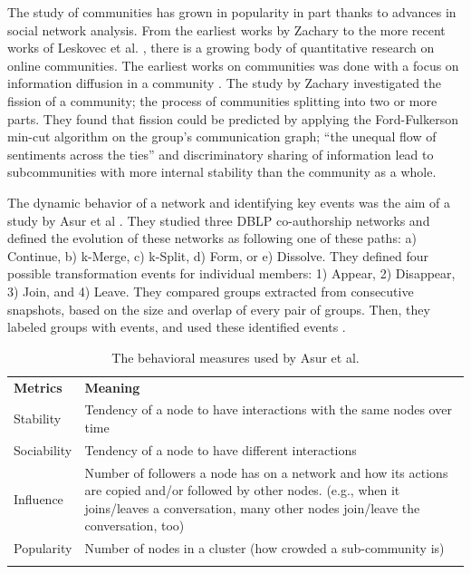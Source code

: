 \documentclass[12pt]{report}
\begin{document}
The study of communities has grown in popularity in part thanks to advances in social network analysis.  From the earliest works by Zachary \cite{Zachary} to the more recent works of Leskovec et al. \cite{LeskovecGraphsOverTime}\cite{LeskovecStatisticalPropertiesOfCommunityStructure}, there is a growing body of quantitative research on online communities. The earliest works on communities was done with a focus on information diffusion in a community \cite{Zachary}. The study by Zachary investigated the fission of a community; the process of communities splitting into two or more parts. They found that fission could be predicted by applying the Ford-Fulkerson min-cut algorithm \cite{Ford} on the group's communication graph; ``the unequal flow of sentiments across the ties'' and discriminatory sharing of information lead to subcommunities with more internal stability than the community as a whole.\cite{Zachary}

The dynamic behavior of a network and identifying key events was the aim of a study by Asur et al \cite{Asur}. They studied three DBLP co-authorship networks and defined the evolution of these networks as following one of these paths: a) Continue, b) k-Merge, c) k-Split, d) Form, or e) Dissolve. They defined four possible transformation events for individual members: 1) Appear, 2) Disappear, 3) Join, and 4) Leave. They compared groups extracted from consecutive snapshots, based on the size and overlap of every pair of groups. Then, they labeled groups with events, and used these identified events \cite{Asur}.

\begin{table}[!htbp]
\caption{The behavioral measures used by Asur et al. \cite{Asur}}
\label{tableDiversityMeasuresAsurEtAl} 
\begin{tabular}{p{} p{}}
\hline\noalign{\smallskip}
\textbf{Metrics} & \textbf{Meaning} \\
\noalign{\smallskip}\hline\noalign{\smallskip}
Stability & Tendency of a node to have interactions with the same nodes over time \\ \hline
Sociability & Tendency of a node to have different interactions \\\hline
Influence & Number of followers a node has on a network and how its actions are copied and/or followed by other nodes. (e.g., when it joins/leaves a conversation, many other nodes join/leave the conversation, too) \\\hline
Popularity & Number of nodes in a cluster (how crowded a sub-community is) \\
\noalign{\smallskip}\hline
\end{tabular}
\end{table}
\end{document}
